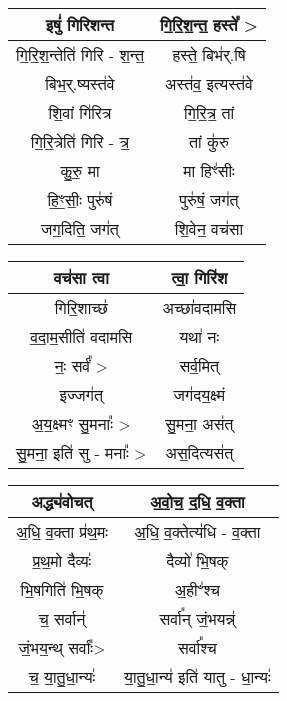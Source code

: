 {\centering
\begin{longtable}{|c|c|}
\hline
इषुं॑ गिरिशन्त               & गि॒रि॒श॒न्त॒ हस्ते᳚ >\\
\hline
गि॒रि॒श॒न्तेति॑ गिरि - श॒न्त॒     & हस्ते॒ बिभ॑र्.षि\\
\hline
बिभ॒र्.ष्यस्त॑वे               & अस्त॑व॒ इत्यस्त॑वे\\
\hline
शि॒वां गि॑रित्र              & गि॒रि॒त्र॒ तां\\
\hline
गि॒रि॒त्रेति॑ गिरि - त्र॒       & तां कु॑रु\\
\hline
कु॒रु॒ मा                    & मा हिꣳ॑सीः\\
\hline
हि॒ꣳ॒सीः॒ पुरु॑षं               & पुरु॑षं॒ जग॑त्\\
\hline
जग॒दिति॒ जग॑त्               & शि॒वेन॒ वच॑सा\\
\hline
\end{longtable}
}
{\centering
\begin{longtable}{|c|c|}
\hline
वच॑सा त्वा                 & त्वा॒ गिरि॑श\\
\hline
गिरि॒शाच्छ॑                 & अच्छा॑वदामसि\\
\hline
व॒दा॒म॒सीति॑ वदामसि          & यथा॑ नः\\
\hline
नः॒ सर्वं᳚ >                 & सर्व॒मित्\\
\hline
इज्जग॑त्                    & जग॑दय॒क्ष्मं\\
\hline
अ॒य॒क्ष्मꣳ सु॒मनाः᳚ >           & सु॒मना॒ अस॑त्\\
\hline
सु॒मना॒ इति॑ सु - मनाः᳚ >      & अस॒दित्यस॑त्\\
\hline
\end{longtable}
}
{\centering
\begin{longtable}{|c|c|}
\hline
अद्ध्य॑वोचत्                 & अ॒वो॒च॒ द॒धि॒ व॒क्ता\\
\hline
अ॒धि॒ व॒क्ता प्र॑थ॒मः            & अ॒धि॒ व॒क्तेत्य॑धि - व॒क्ता\\
\hline
प्र॒थ॒मो दैव्यः॑               & दैव्यो॑ भि॒षक्\\
\hline
भि॒षगिति॑ भि॒षक्             & अ॒हीꣲ॑श्च\\
\hline
च॒ सर्वान्॑                  & सर्वा᳚न् जं॒भयन्न्॑\\
\hline
जं॒भय॒न्थ् सर्वाः᳚>             & सर्वा᳚श्च\\
\hline
च॒ या॒तु॒धा॒न्यः॑               & या॒तु॒धा॒न्य॑ इति॑ यातु - धा॒न्यः॑\\
\hline
\end{longtable}
}
